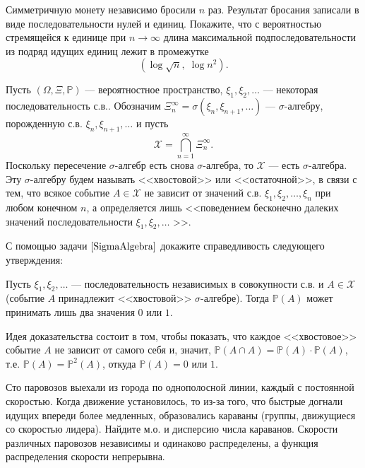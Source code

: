 \begin{problem}
Симметричную монету независимо бросили $n$ раз. Результат бросания записали в виде последовательности нулей и единиц. Покажите, что с вероятностью стремящейся к единице при $n\to \infty $ длина максимальной подпоследовательности из подряд идущих единиц лежит в промежутке
\[\left(\log \sqrt{n} ,\; \log n^{2} \right).\] 
\end{problem}

\begin{problem}
Пусть $(\Omega,\Xi,{\mathbb P})$ --- вероятностное пространство, $\xi_1,\xi_2,\ldots$ --- некоторая последовательность с.в.. 
Обозначим $\Xi_n^{\infty}=\sigma(\xi_{n},\xi_{n+1},\ldots)$ --- $\sigma$-алгебру, порожденную с.в. $\xi_{n},\xi_{n+1},\ldots$ и пусть 
$$
{\mathcal X}=\bigcap\limits_{n=1}^{\infty} \Xi_{n}^{\infty} . 
$$
Поскольку пересечение $\sigma$-алгебр есть снова $\sigma$-алгебра, то ${\mathcal X}$ --- есть $\sigma$-алгебра. Эту $\sigma$-алгебру 
будем называть <<хвостовой>> или <<остаточной>>, в связи с тем, что всякое событие $A\in{\mathcal X}$ не зависит от значений с.в. 
$\xi_1,\xi_2,\ldots,\xi_n$ при любом конечном $n$, а определяется лишь <<поведением бесконечно далеких значений последовательности 
$\xi_1,\xi_2,\ldots$ >>. 

С помощью задачи $\ref{SigmaAlgebra}$ докажите справедливость следующего утверждения: 

Пусть $\xi_1,\xi_2,\ldots$ --- последовательность независимых в совокупности с.в. и $A\in{\mathcal X}$ 
(событие $A$ принадлежит <<хвостовой>> $\sigma$-алгебре). Тогда ${\mathbb P}(A)$ может принимать лишь два значения $0$ или $1$. 
\end{problem}

\begin{ordre}
Идея доказательства состоит в том, чтобы показать, что каждое <<хвостовое>> событие $A$ не зависит от самого себя и, значит, 
${\mathbb P}(A\cap A)={\mathbb P}(A)\cdot {\mathbb P}(A)$, т.е. ${\mathbb P}(A)={\mathbb P}^2(A)$, откуда 
${\mathbb P}(A)=0$ или $1$. 
\end{ordre}

\begin{problem}
Сто паровозов выехали из города по однополосной линии, каждый с постоянной скоростью. Когда движение установилось, то из-за того, что быстрые догнали идущих впереди более медленных, образовались караваны (группы, движущиеся со скоростью лидера). Найдите м.о. и дисперсию числа караванов. Скорости различных паровозов независимы и одинаково распределены, а функция распределения скорости непрерывна.
\end{problem}

